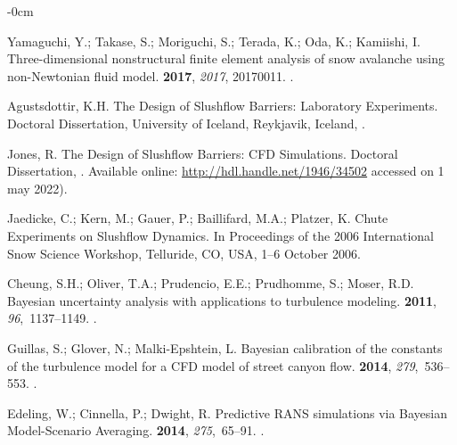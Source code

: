 \documentclass[mathematics,article,accept,pdftex,moreauthors]{Definitions/mdpi}
\begin{document}
\begin{adjustwidth}{-\extralength}{0cm}
\begin{thebibliography}{999}
Yamaguchi, Y.; Takase, S.; Moriguchi, S.; Terada, K.; Oda, K.; Kamiishi, I.
\newblock Three-dimensional nonstructural finite element analysis of snow
  avalanche using non-Newtonian fluid model.
 {\bf 2017}, {\em 2017}, 20170011.
.

Agustsdottir, K.H.
\newblock The Design of Slushflow Barriers: Laboratory Experiments. Doctoral Dissertation, University of Iceland,  Reykjavik, Iceland, 
.

Jones, R.
\newblock The Design of Slushflow Barriers: CFD Simulations. Doctoral Dissertation,
.
\newblock
  Available online:  \url{http://hdl.handle.net/1946/34502}  accessed on 1 may 2022).

Jaedicke, C.; Kern, M.; Gauer, P.; Baillifard, M.A.; Platzer, K.
\newblock Chute Experiments on Slushflow Dynamics. In  Proceedings of the   2006 International Snow Science Workshop,  Telluride, CO, USA, 1--6 October 2006.
\newblock  

Cheung, S.H.; Oliver, T.A.; Prudencio, E.E.; Prudhomme, S.; Moser, R.D.
\newblock Bayesian uncertainty analysis with applications to turbulence
  modeling.
 {\bf 2011}, {\em
  96},~1137--1149.
.

Guillas, S.; Glover, N.; Malki-Epshtein, L.
\newblock Bayesian calibration of the constants of the turbulence model for a
  {CFD} model of street canyon flow.
 {\bf
  2014}, {\em 279},~536--553.
.

Edeling, W.; Cinnella, P.; Dwight, R.
\newblock Predictive {RANS} simulations via Bayesian Model-Scenario Averaging.
 {\bf 2014}, {\em 275},~65--91.
.


\end{thebibliography}
\end{adjustwidth}
\end{document}
